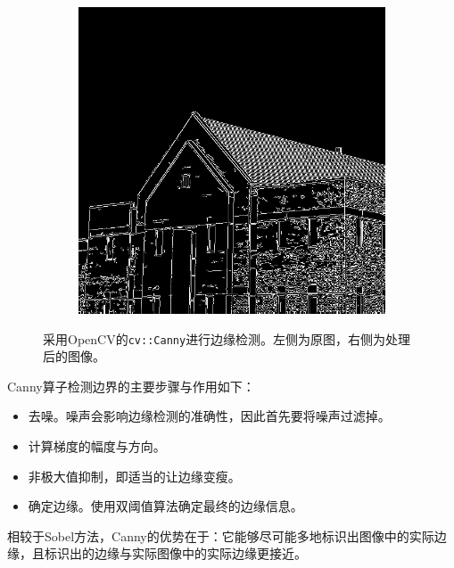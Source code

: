 \documentclass{article}
\begin{document}
\begin{figure}[htbp]
\begin{subfigure}{.4\textwidth}
        \includegraphics[width=\linewidth]{img/canny.png}
    \end{subfigure}
    \caption{采用OpenCV的\texttt{cv::Canny}进行边缘检测。左侧为原图，右侧为处理后的图像。}
\end{figure}


Canny算子检测边界的主要步骤与作用如下：

\begin{itemize}
    \item 去噪。噪声会影响边缘检测的准确性，因此首先要将噪声过滤掉。
    \item 计算梯度的幅度与方向。
    \item 非极大值抑制，即适当的让边缘变瘦。
    \item 确定边缘。使用双阈值算法确定最终的边缘信息。
\end{itemize}

相较于Sobel方法，Canny的优势在于：它能够尽可能多地标识出图像中的实际边缘，且标识出的边缘与实际图像中的实际边缘更接近。
\end{document}
